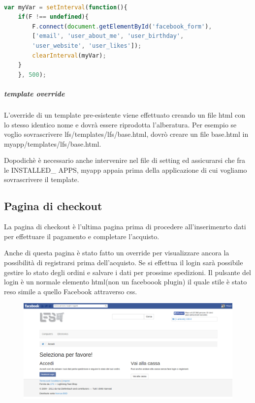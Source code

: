 \begin{lstlisting}[language=JavaScript]

var myVar = setInterval(function(){
    if(F !== undefined){
        F.connect(document.getElementById('facebook_form'), 
        ['email', 'user_about_me', 'user_birthday', 
        'user_website', 'user_likes']);
        clearInterval(myVar);
    }
    }, 500);

\end{lstlisting}

\subparagraph{template override}
L'override di un template pre-esistente viene effettuato creando un file html con lo stesso identico nome e dovrà essere riprodotta l'alberatura. Per esempio se voglio sovrascrivere lfs/templates/lfs/base.html, dovrò creare un file base.html in myapp/templates/lfs/base.html. 

Dopodichè è necessario anche intervenire nel file di setting ed assicurarsi che fra le INSTALLED\_ APPS, myapp appaia prima della applicazione di cui vogliamo sovrascrivere il template.

\subsection{Pagina di checkout}
La pagina di checkout è l'ultima pagina prima di procedere all'inserimenrto dati per effettuare il pagamento e completare l'acquisto.

Anche di questa pagina è stato fatto un override per visualizzare ancora la possibilità di registrarsi prima dell'acquisto. Se si effettua il login sarà possibile gestire lo stato degli ordini e salvare i dati per prossime spedizioni. Il pulsante del login è un normale elemento html(non un faceboook plugin) il quale stile è stato reso simile a quello Facebook attraverso css. 

\begin{figure}
\includegraphics[width=0.9\columnwidth]{img/checkout}
\end{figure}

